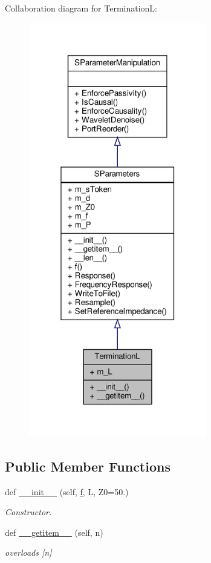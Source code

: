 Collaboration diagram for TerminationL\+:\nopagebreak
\begin{figure}[H]
\begin{center}
\leavevmode
\includegraphics[width=220pt]{classSignalIntegrity_1_1SParameters_1_1Devices_1_1TerminationL_1_1TerminationL__coll__graph}
\end{center}
\end{figure}
\subsection*{Public Member Functions}
\begin{DoxyCompactItemize}
\item 
def \hyperlink{classSignalIntegrity_1_1SParameters_1_1Devices_1_1TerminationL_1_1TerminationL_ad506006bc5bc92f9e3fdb69c52d64eba}{\+\_\+\+\_\+init\+\_\+\+\_\+} (self, \hyperlink{classSignalIntegrity_1_1SParameters_1_1SParameters_1_1SParameters_a32e7a34d6837fe949b413c852a0447f8}{f}, L, Z0=50.)
\begin{DoxyCompactList}\small\item\em Constructor. \end{DoxyCompactList}\item 
def \hyperlink{classSignalIntegrity_1_1SParameters_1_1Devices_1_1TerminationL_1_1TerminationL_ab7a6da5139e0878b590d68292aaa70f2}{\+\_\+\+\_\+getitem\+\_\+\+\_\+} (self, n)
\begin{DoxyCompactList}\small\item\em overloads \mbox{[}n\mbox{]} \end{DoxyCompactList}\end{DoxyCompactItemize}


